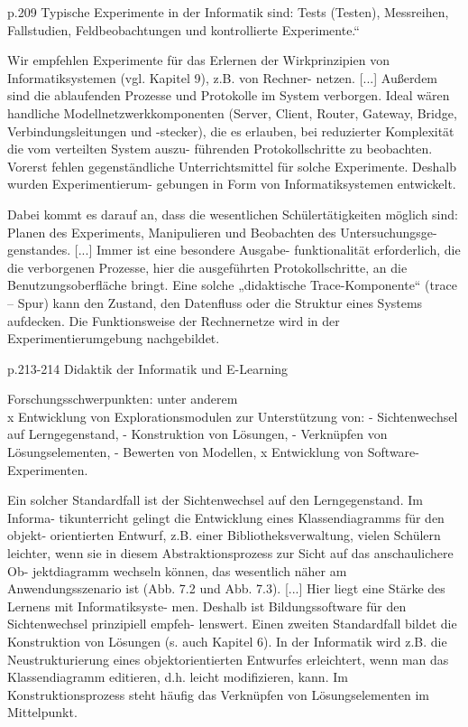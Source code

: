 p.209
  Typische  Experimente  in  der  Informatik  sind:  Tests  (Testen), 
Messreihen,  Fallstudien,  Feldbeobachtungen  und  kontrollierte  Experimente.“ 

 Wir empfehlen Experimente für das Erlernen 
der Wirkprinzipien von Informatiksystemen (vgl. Kapitel 9), z.B. von Rechner-
netzen. [...]
Außerdem sind die ablaufenden Prozesse und Protokolle 
im  System  verborgen.  Ideal  wären  handliche  Modellnetzwerkkomponenten 
(Server, Client, Router, Gateway, Bridge, Verbindungsleitungen und -stecker), 
die es erlauben, bei reduzierter Komplexität die vom verteilten System auszu-
führenden  Protokollschritte  zu  beobachten.  Vorerst  fehlen  gegenständliche 
Unterrichtsmittel für solche Experimente. Deshalb wurden Experimentierum-
gebungen in Form von Informatiksystemen entwickelt.  

Dabei  kommt  es  darauf  an,  dass  die  wesentlichen  Schülertätigkeiten  möglich 
sind: Planen des Experiments, Manipulieren und Beobachten des Untersuchungsge-
genstandes.  [...]  Immer  ist  eine  besondere  Ausgabe-
funktionalität erforderlich, die die verborgenen Prozesse, hier die ausgeführten 
Protokollschritte, an die Benutzungsoberfläche bringt. Eine solche „didaktische 
Trace-Komponente“ (trace – Spur) kann den Zustand, den Datenfluss oder die 
Struktur eines Systems aufdecken. Die Funktionsweise der Rechnernetze wird 
in der Experimentierumgebung nachgebildet.

p.213-214
Didaktik der Informatik und E-Learning 

Forschungsschwerpunkten: unter anderem\\
x Entwicklung von Explorationsmodulen zur Unterstützung von: 
- Sichtenwechsel auf Lerngegenstand, 
- Konstruktion von Lösungen, 
- Verknüpfen von Lösungselementen, 
- Bewerten von Modellen, 
x Entwicklung von Software-Experimenten. 

Ein solcher Standardfall ist der Sichtenwechsel auf den Lerngegenstand. Im Informa-
tikunterricht gelingt die Entwicklung eines Klassendiagramms für den objekt-
orientierten Entwurf, z.B. einer Bibliotheksverwaltung, vielen Schülern leichter, 
wenn sie in diesem Abstraktionsprozess zur Sicht auf das anschaulichere Ob-
jektdiagramm wechseln können, das wesentlich näher am Anwendungsszenario 
ist (Abb. 7.2 und Abb. 7.3). [...] Hier liegt eine Stärke des Lernens mit Informatiksyste-
men. Deshalb ist Bildungssoftware für den Sichtenwechsel prinzipiell empfeh-
lenswert. 
Einen zweiten Standardfall bildet die Konstruktion von Lösungen (s. auch Kapitel 
6). In der Informatik wird z.B. die Neustrukturierung eines objektorientierten 
Entwurfes  erleichtert,  wenn  man  das  Klassendiagramm  editieren,  d.h.  leicht 
modifizieren,  kann.  Im  Konstruktionsprozess  steht  häufig  das  Verknüpfen  von 
Lösungselementen im Mittelpunkt. 

